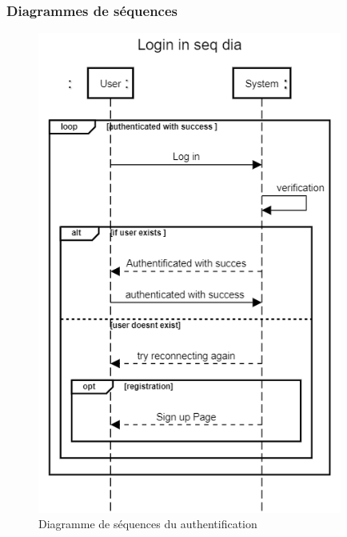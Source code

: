 \documentclass[french, a4paper, 12pt]{report}
\begin{document}
		\subsubsection{Diagrammes de séquences}
			\begin{figure}[!h]
  				\center
  				\includegraphics[width=10cm]{seqlogin.png}
  				\caption{Diagramme de séquences du authentification}
  				\label{fig:seqlogin}
			\end{figure}
			
\end{document}
